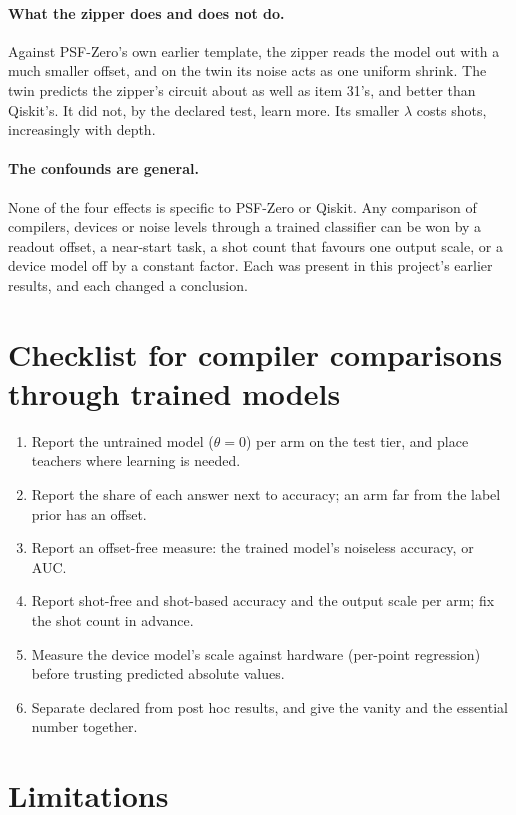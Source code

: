 \documentclass[11pt]{article}
\begin{document}
\paragraph{What the zipper does and does not do.} Against PSF-Zero's own earlier template, the zipper reads the model
out with a much smaller offset, and on the twin its noise acts as one uniform shrink. The twin predicts the zipper's
circuit about as well as item 31's, and better than Qiskit's. It
did not, by the declared test, learn more. Its smaller $\lambda$ costs shots, increasingly with depth.

\paragraph{The confounds are general.} None of the four effects is specific to PSF-Zero or Qiskit. Any comparison of
compilers, devices or noise levels through a trained classifier can be won by a readout offset, a near-start task, a
shot count that favours one output scale, or a device model off by a constant factor. Each was present in this
project's earlier results, and each changed a conclusion.

\section{Checklist for compiler comparisons through trained models}

\begin{enumerate}
\item Report the untrained model ($\theta = 0$) per arm on the test tier, and place teachers where learning is needed.
\item Report the share of each answer next to accuracy; an arm far from the label prior has an offset.
\item Report an offset-free measure: the trained model's noiseless accuracy, or AUC.
\item Report shot-free and shot-based accuracy and the output scale per arm; fix the shot count in advance.
\item Measure the device model's scale against hardware (per-point regression) before trusting predicted absolute
values.
\item Separate declared from post hoc results, and give the vanity and the essential number together.
\end{enumerate}

\section{Limitations}
\end{document}
